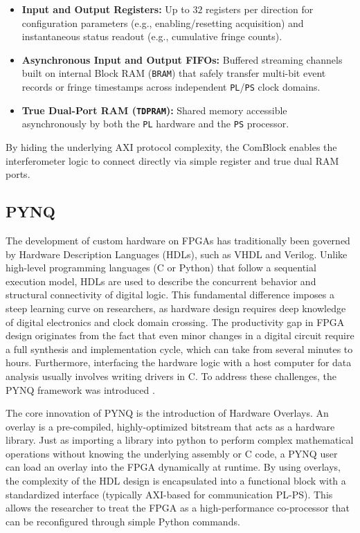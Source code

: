 \begin{itemize}
    \item \textbf{Input and Output Registers:} Up to $32$ registers per direction for configuration parameters (e.g., enabling/resetting acquisition) and instantaneous status readout (e.g., cumulative fringe counts).
    \item \textbf{Asynchronous Input and Output FIFOs:} Buffered streaming channels built on internal Block RAM (\texttt{BRAM}) that safely transfer multi-bit event records or fringe timestamps across independent \texttt{PL}/\texttt{PS} clock domains.
    \item \textbf{True Dual-Port RAM (\texttt{TDPRAM}):} Shared memory accessible asynchronously by both the \texttt{PL} hardware and the \texttt{PS} processor.
\end{itemize}
By hiding the underlying AXI protocol complexity, the ComBlock enables the interferometer logic to connect directly via simple register and true dual RAM ports.


\subsection{PYNQ}

The development of custom hardware on FPGAs has traditionally been governed by Hardware Description Languages (HDLs), such as VHDL and Verilog. Unlike high-level programming languages (C or Python) that follow a sequential execution model, HDLs are used to describe the concurrent behavior and structural connectivity of digital logic. This fundamental difference imposes a steep learning curve on researchers, as hardware design requires deep knowledge of digital electronics and clock domain crossing. The productivity gap in FPGA design originates from the fact that even minor changes in a digital circuit require a full synthesis and implementation cycle, which can take from several minutes to hours. Furthermore, interfacing the hardware logic with a host computer for data analysis usually involves writing drivers in C. To address these challenges, the PYNQ framework was introduced \cite{PYNQ}.


The core innovation of PYNQ is the introduction of Hardware Overlays. An overlay is a pre-compiled, highly-optimized bitstream that acts as a hardware library. Just as importing a library into python to perform complex mathematical operations without knowing the underlying assembly or C code, a PYNQ user can load an overlay into the FPGA dynamically at runtime. By using overlays, the complexity of the HDL design is encapsulated into a functional block with a standardized interface (typically AXI-based for communication PL-PS). This allows the researcher to treat the FPGA as a high-performance co-processor that can be reconfigured through simple Python commands.


